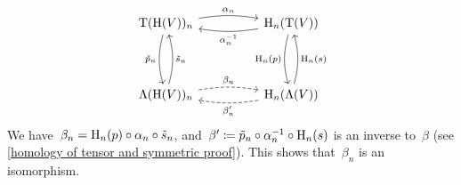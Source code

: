 \documentclass[a4paper,10pt,headings=standardclasses]{scrartcl}
\begin{document}
\begin{example}
\begin{enumerate}
      \[
        \begin{tikzcd}[column sep = huge, row sep = 4em]
          \dgTensor(\homology(V))_n
          \arrow[bend left = 9]{r}[above]{\alpha_n}
          \arrow[bend right = 15]{d}[left]{\tilde{p}_n}
          &
          \homology_n(\dgTensor(V))
          \arrow[bend left = 9]{l}[below]{\alpha_n^{-1}}
          \arrow[bend right = 15]{d}[left]{\homology_n(p)}
          \\
          \dgSymm(\homology(V))_n
          \arrow[bend right = 15]{u}[right]{\tilde{s}_n}
          \arrow[dashed, bend left = 9]{r}[above]{\beta_n}
          &
          \homology_n(\dgSymm(V))
          \arrow[bend right = 15]{u}[right]{\homology_n(s)}
          \arrow[dashed, bend left = 9]{l}[below]{\beta'_n}
        \end{tikzcd}
      \]
      We have~$\beta_n = \operatorname{H}_n(p) \circ \alpha_n \circ \tilde{s}_n$, and~$\beta' \coloneqq \tilde{p}_n \circ \alpha_n^{-1} \circ \operatorname{H}_n(s)$ is an inverse to~$\beta$ (see \cref{homology of tensor and symmetric proof}).
      This shows that~$\beta_n$ is an isomorphism.
  \end{enumerate}
\end{example}


\end{document}
